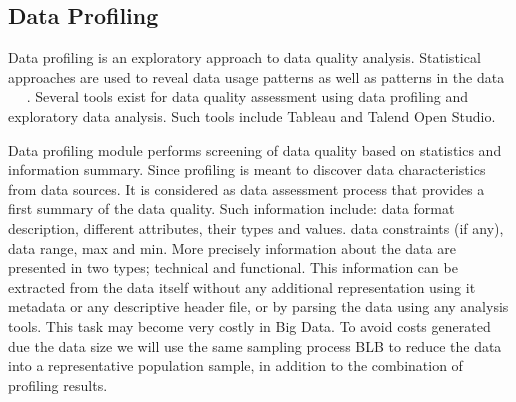 \subsection{Data Profiling}

Data profiling is an exploratory approach to data quality analysis. Statistical approaches are used to reveal 
data usage patterns as well as patterns in the data ~\cite{Osborne2013} ~\cite{Maydanchik2007}. Several tools exist for data quality assessment using data profiling 
and exploratory data analysis. Such tools include Tableau and Talend Open Studio. 

Data profiling module performs screening of data quality
based on statistics and information summary. Since
profiling is meant to discover data characteristics from data sources. It is considered as data assessment process that
provides a first summary of the data quality. Such information include: data format description, different
attributes, their types and values. data constraints (if any),
data range, max and min. More precisely information about
the data are presented in two types; technical and functional. This information can be extracted from the data itself
without any additional representation using it metadata or any descriptive header file, or by parsing the data using any
analysis tools. This task may become very costly in Big Data. To avoid costs generated due the data size we will use
the same sampling process BLB to reduce the data into a representative population sample, in addition to the combination of profiling results.

